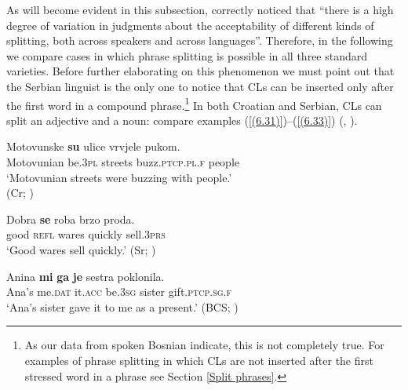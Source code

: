 As will become evident in this subsection, \citet[4]{FranksPeti06} correctly noticed that “there is a high degree of variation in judgments about the acceptability of different kinds of splitting, both across speakers and across languages”. Therefore, in the following we compare cases in which phrase splitting is possible in all three standard varieties. Before further elaborating on this phenomenon we must point out that the Serbian linguist \citet[306]{Popovic04} is the only one to notice that CLs can be inserted only after the first word in a compound phrase.\footnote{As our data from spoken Bosnian indicate, this is not completely true. For examples of phrase splitting in which CLs are not inserted after the first stressed word in a phrase see Section \ref{Split phrases}.}  In both Croatian and Serbian, CLs can split an adjective and a noun: compare examples (\ref{(6.31)})--(\ref{(6.33)}) (\citealt[cf.][246]{TezakBabic96}, \citealt[450]{PiperKlajn14}). 

\begin{exe}\ex\label{(6.31)}
\gll Motovunske \textbf{su} ulice vrvjele pukom. \\
 Motovunian be\textsc{.3pl} streets buzz\textsc{.ptcp.pl.f} people\\
\glt ‘Motovunian streets were buzzing with people.’ \\
\hfill  (Cr; \citealt[246]{TezakBabic96})

\ex\label{(6.32)}
\gll Dobra \textbf{se} roba brzo proda.\\
 good \textsc{refl} wares quickly sell\textsc{.3prs} \\
\glt ‘Good wares sell quickly.’ 
\hfill  (Sr; \citealt[450]{PiperKlajn14})

\ex\label{(6.33)}
\gll Anina \textbf{mi} \textbf{ga} \textbf{je} sestra poklonila. \\
 Ana’s me\textsc{.dat} it\textsc{.acc} be\textsc{.3sg} sister gift\textsc{.ptcp.sg.f}\\
\glt ‘Ana’s sister gave it to me as a present.’ 
\hfill (BCS; \citealt[419]{Progovac96})
\end{exe}

